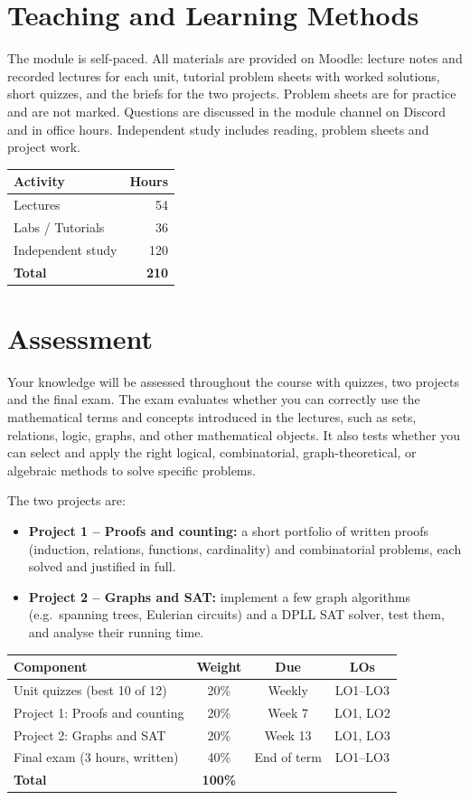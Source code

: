 \documentclass[11pt,a4paper]{article}
\begin{document}
\section{Teaching and Learning Methods}
The module is self-paced. All materials are provided on Moodle: lecture notes and
recorded lectures for each unit, tutorial problem sheets with worked solutions,
short quizzes, and the briefs for the two projects. Problem sheets are for practice
and are not marked. Questions are discussed in the module channel on Discord and in
office hours. Independent study includes reading, problem sheets and project work.

\begin{tabularx}{0.6\textwidth}{X r}
\toprule
\textbf{Activity} & \textbf{Hours} \\
\midrule
Lectures            & 54 \\
Labs / Tutorials    & 36 \\
Independent study   & 120 \\
\midrule
\textbf{Total}      & \textbf{210} \\
\bottomrule
\end{tabularx}

\section{Assessment}
Your knowledge will be assessed throughout the course with quizzes, two projects and the
final exam. The exam evaluates whether you can correctly use the mathematical terms and
concepts introduced in the lectures, such as sets, relations, logic, graphs, and
other mathematical objects. It also tests whether you can select and apply the
right logical, combinatorial, graph-theoretical, or algebraic methods to solve
specific problems.

The two projects are:
\begin{itemize}
  \item \textbf{Project 1 -- Proofs and counting:} a short portfolio of written
        proofs (induction, relations, functions, cardinality) and combinatorial
        problems, each solved and justified in full.
  \item \textbf{Project 2 -- Graphs and SAT:} implement a few graph algorithms
        (e.g.\ spanning trees, Eulerian circuits) and a DPLL SAT solver, test them,
        and analyse their running time.
\end{itemize}

\begin{tabularx}{\textwidth}{X c c c}
\toprule
\textbf{Component} & \textbf{Weight} & \textbf{Due} & \textbf{LOs} \\
\midrule
Unit quizzes (best 10 of 12) & 20\% & Weekly & LO1--LO3 \\
Project 1: Proofs and counting & 20\% & Week 7 & LO1, LO2 \\
Project 2: Graphs and SAT & 20\% & Week 13 & LO1, LO3 \\
Final exam (3 hours, written) & 40\% & End of term & LO1--LO3 \\
\midrule
\textbf{Total}      & \textbf{100\%} & & \\
\bottomrule
\end{tabularx}
\end{document}
